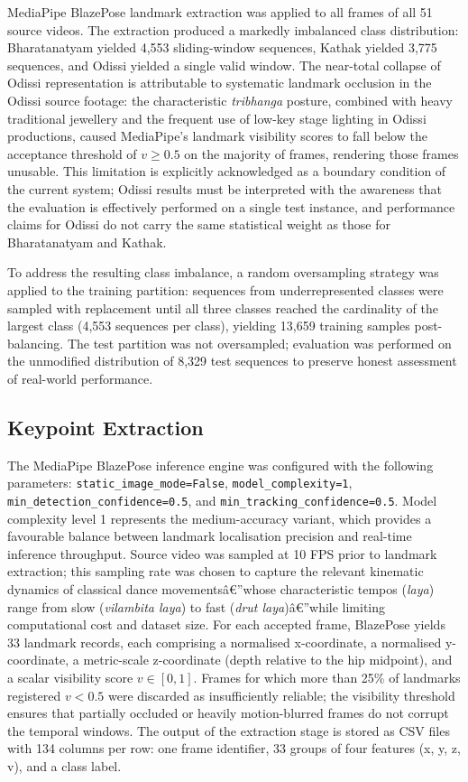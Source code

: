 \documentclass[journal]{IEEEtran}
\begin{document}
MediaPipe BlazePose landmark extraction was applied to all frames of all
51 source videos. The extraction produced a markedly imbalanced class
distribution: Bharatanatyam yielded 4,553 sliding-window sequences,
Kathak yielded 3,775 sequences, and Odissi yielded a single valid
window. The near-total collapse of Odissi representation is attributable
to systematic landmark occlusion in the Odissi source footage: the
characteristic \textit{tribhanga} posture, combined with heavy
traditional jewellery and the frequent use of low-key stage lighting
in Odissi productions, caused MediaPipe's landmark visibility scores
to fall below the acceptance threshold of $v \geq 0.5$ on the majority
of frames, rendering those frames unusable. This limitation is
explicitly acknowledged as a boundary condition of the current system;
Odissi results must be interpreted with the awareness that the evaluation
is effectively performed on a single test instance, and performance
claims for Odissi do not carry the same statistical weight as those
for Bharatanatyam and Kathak.

To address the resulting class imbalance, a random oversampling strategy
was applied to the training partition: sequences from underrepresented
classes were sampled with replacement until all three classes reached
the cardinality of the largest class (4,553 sequences per class),
yielding 13,659 training samples post-balancing. The test partition was
not oversampled; evaluation was performed on the unmodified distribution
of 8,329 test sequences to preserve honest assessment of real-world
performance.

\subsection{Keypoint Extraction}

The MediaPipe BlazePose inference engine was configured with the
following parameters: \texttt{static\_image\_mode=False},
\texttt{model\_complexity=1}, \texttt{min\_detection\_confidence=0.5},
and \texttt{min\_tracking\_confidence=0.5}. Model complexity level 1
represents the medium-accuracy variant, which provides a
favourable balance between landmark localisation precision and
real-time inference throughput. Source video was sampled at 10 FPS
prior to landmark extraction; this sampling rate was chosen to capture
the relevant kinematic dynamics of classical dance movementsâ€”whose
characteristic tempos (\textit{laya}) range from slow (\textit{vilambita
laya}) to fast (\textit{drut laya})â€”while limiting computational cost
and dataset size. For each accepted frame, BlazePose yields 33 landmark
records, each comprising a normalised x-coordinate, a normalised
y-coordinate, a metric-scale z-coordinate (depth relative to the hip
midpoint), and a scalar visibility score $v \in [0, 1]$. Frames for
which more than 25\% of landmarks registered $v < 0.5$ were discarded
as insufficiently reliable; the visibility threshold ensures that
partially occluded or heavily motion-blurred frames do not corrupt
the temporal windows. The output of the extraction stage is stored as
CSV files with 134 columns per row: one frame identifier, 33 groups
of four features (x, y, z, v), and a class label.
\end{document}
